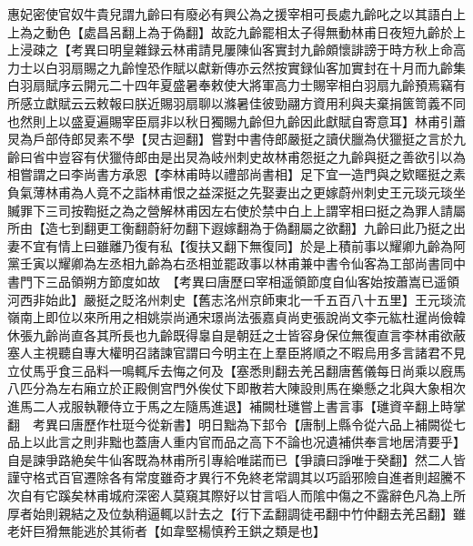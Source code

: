 惠妃密使官奴牛貴兒謂九齡曰有廢必有興公為之援宰相可長處九齡叱之以其語白上上為之動色【處昌呂翻上為于偽翻】故訖九齡罷相太子得無動林甫日夜短九齡於上上浸疎之【考異曰明皇雜録云林甫請見屢陳仙客實封九齡頗懷誹謗于時方秋上命高力士以白羽扇賜之九齡惶恐作賦以獻新傳亦云然按實録仙客加實封在十月而九齡集白羽扇賦序云開元二十四年夏盛暑奉敕使大將軍高力士賜宰相白羽扇九齡預焉竊有所感立獻賦云云敕報曰朕近賜羽扇聊以滌暑佳彼勁翮方資用利與夫棄捐篋笥義不同也然則上以盛夏遍賜宰臣扇非以秋日獨賜九齡但九齡因此獻賦自寄意耳】林甫引蕭炅為戶部侍郎炅素不學【炅古迴翻】嘗對中書侍郎嚴挺之讀伏臘為伏獵挺之言於九齡曰省中豈容有伏獵侍郎由是出炅為岐州刺史故林甫怨挺之九齡與挺之善欲引以為相嘗謂之曰李尚書方承恩【李林甫時以禮部尚書相】足下宜一造門與之欵䁥挺之素負氣薄林甫為人竟不之詣林甫恨之益深挺之先娶妻出之更嫁蔚州刺史王元琰元琰坐贓罪下三司按鞫挺之為之營解林甫因左右使於禁中白上上謂宰相曰挺之為罪人請屬所由【造七到翻更工衡翻蔚紆勿翻下遐嫁翻為于偽翻屬之欲翻】九齡曰此乃挺之出妻不宜有情上曰雖離乃復有私【復扶又翻下無復同】於是上積前事以耀卿九齡為阿黨壬寅以耀卿為左丞相九齡為右丞相並罷政事以林甫兼中書令仙客為工部尚書同中書門下三品領朔方節度如故　【考異曰唐歷曰宰相遥領節度自仙客始按蕭嵩已遥領河西非始此】嚴挺之貶洺州刺史【舊志洺州京師東北一千五百八十五里】王元琰流嶺南上即位以來所用之相姚崇尚通宋璟尚法張嘉貞尚吏張說尚文李元紘杜暹尚儉韓休張九齡尚直各其所長也九齡既得辠自是朝廷之士皆容身保位無復直言李林甫欲蔽塞人主視聽自專大權明召諸諫官謂曰今明主在上羣臣將順之不暇烏用多言諸君不見立仗馬乎食三品料一鳴輒斥去悔之何及【塞悉則翻去羌呂翻唐舊儀每日尚乘以廐馬八匹分為左右廂立於正殿側宫門外俟仗下即散若大陳設則馬在樂懸之北與大象相次進馬二人戎服執鞭侍立于馬之左隨馬進退】補闕杜璡嘗上書言事【璡資辛翻上時掌翻　考異曰唐歷作杜珽今從新書】明日黜為下邽令【唐制上縣令從六品上補闕從七品上以此言之則非黜也蓋唐人重内官而品之高下不論也况遺補供奉言地居清要乎】自是諫爭路絶矣牛仙客既為林甫所引專給唯諾而已【爭讀曰諍唯于癸翻】然二人皆謹守格式百官遷除各有常度雖奇才異行不免終老常調其以巧謟邪險自進者則超騰不次自有它蹊矣林甫城府深密人莫窺其際好以甘言㗖人而隂中傷之不露辭色凡為上所厚者始則親結之及位埶稍逼輒以計去之【行下孟翻調徒弔翻中竹仲翻去羌呂翻】雖老奸巨猾無能逃於其術者【如韋堅楊慎矜王鉷之類是也】

